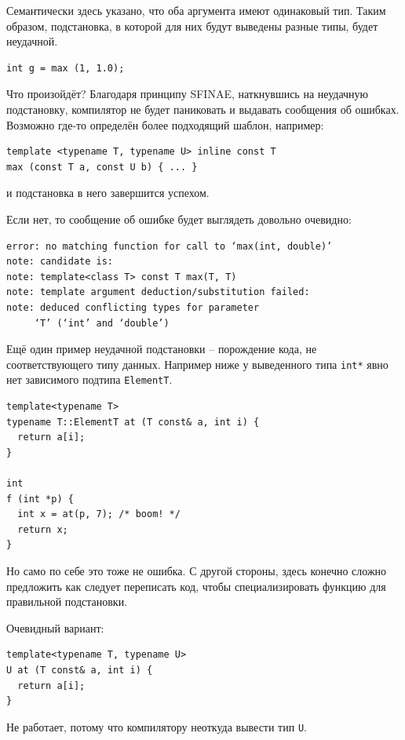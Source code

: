 \documentclass[a4paper,12pt,oneside]{article}
\begin{document}
Семантически здесь указано, что оба аргумента имеют одинаковый тип. Таким образом, подстановка, в которой для них будут выведены разные типы, будет неудачной.

\begin{lstlisting}
int g = max (1, 1.0);
\end{lstlisting}

Что произойдёт? Благодаря принципу SFINAE, наткнувшись на неудачную подстановку, компилятор не будет паниковать и выдавать сообщения об ошибках. Возможно где-то определён более подходящий шаблон, например:

\begin{lstlisting}
template <typename T, typename U> inline const T 
max (const T a, const U b) { ... }
\end{lstlisting}

и подстановка в него завершится успехом.

Если нет, то сообщение об ошибке будет выглядеть довольно очевидно:

\begin{verbatim}
error: no matching function for call to ‘max(int, double)’
note: candidate is:
note: template<class T> const T max(T, T)
note: template argument deduction/substitution failed:
note: deduced conflicting types for parameter 
     ‘T’ (‘int’ and ‘double’)
\end{verbatim}

Ещё один пример неудачной подстановки -- порождение кода, не соответствующего типу данных. Например ниже у выведенного типа \lstinline!int*! явно нет зависимого подтипа \lstinline!ElementT!.

\begin{lstlisting}
template<typename T>
typename T::ElementT at (T const& a, int i) {
  return a[i];
}

int
f (int *p) {
  int x = at(p, 7); /* boom! */
  return x;
}
\end{lstlisting}

Но само по себе это тоже не ошибка. С другой стороны, здесь конечно сложно предложить как следует переписать код, чтобы специализировать функцию для правильной подстановки. 

Очевидный вариант:

\begin{lstlisting}
template<typename T, typename U>
U at (T const& a, int i) {
  return a[i];
}
\end{lstlisting}

Не работает, потому что компилятору неоткуда вывести тип \lstinline!U!.
\end{document}
